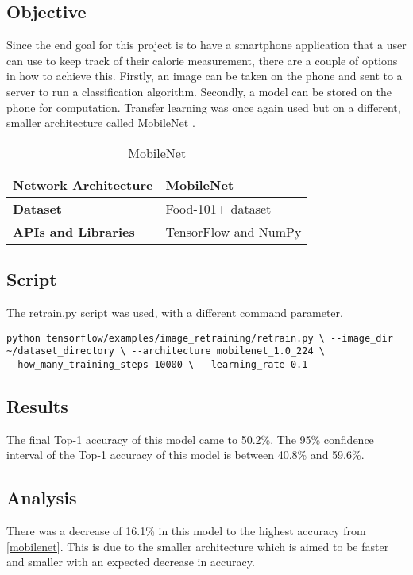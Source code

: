 \tocless\subsection{Objective}
Since the end goal for this project is to have a smartphone
application that a user can use to keep track of their calorie measurement,
there are a couple of options in how to achieve this. Firstly, an image can be
taken on the phone and sent to a server to run a classification algorithm.
Secondly, a model can be stored on the phone for computation. Transfer learning was once again used but on a different, smaller architecture called MobileNet \parencite{mobilenet}.

\begin{table}[h]
\centering
\caption{MobileNet}
\label{my-label}
\begin{tabular}{|l|p{8cm}|}
\hline
\textbf{Network Architecture} & MobileNet           \\ \hline
\textbf{Dataset}              & Food-101+ dataset \\ \hline
\textbf{APIs and Libraries}   & TensorFlow and NumPy                                                       \\ \hline
\end{tabular}
\end{table}

\tocless\subsection{Script}
The retrain.py script \parencite{retrainInception} was used, with a different
command parameter.

\begin{lstlisting}[style=Command]
python tensorflow/examples/image_retraining/retrain.py \ --image_dir
~/dataset_directory \ --architecture mobilenet_1.0_224 \
--how_many_training_steps 10000 \ --learning_rate 0.1
\end{lstlisting}

\tocless\subsection{Results}
The final Top-1 accuracy of this model came to 50.2\%.
The 95\% confidence interval of the Top-1 accuracy of this model is between 40.8\% and 59.6\%.

\tocless\subsection{Analysis}
There was a decrease of 16.1\% in this model to the highest accuracy from
\ref{mobilenet}. This is due to the smaller architecture which is aimed to be faster
and smaller with an expected decrease in accuracy.
